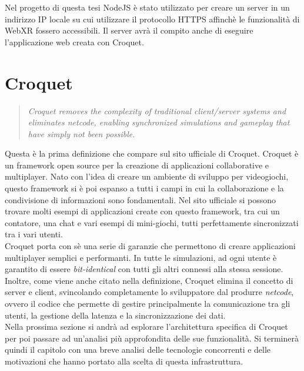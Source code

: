 Nel progetto di questa tesi NodeJS è stato utilizzato per creare un server in un indirizzo IP locale su cui utilizzare il protocollo HTTPS affinchè le funzionalità di WebXR fossero
accessibili. Il server avrà il compito anche di eseguire l'applicazione web creata con Croquet.


\section{Croquet}\label{sec:Croquet}
\begin{quote}
    \textit{Croquet removes the complexity of traditional client/server systems and eliminates netcode, enabling synchronized simulations and gameplay that have simply not been 
    possible.}\cite{Croquet}
\end{quote}
Questa è la prima definizione che compare sul sito ufficiale di Croquet. Croquet è un framework open source per la creazione di applicazioni collaborative e 
multiplayer. Nato con l'idea di creare un ambiente di sviluppo per videogiochi, questo framework si è poi espanso a tutti i campi in cui la collaborazione e la condivisione
di informazioni sono fondamentali. Nel sito ufficiale si possono trovare molti esempi di applicazioni create con questo framework, tra cui un contatore, una chat e vari esempi di mini-giochi, tutti
perfettamente sincronizzati tra i vari utenti.\\
Croquet porta con sè una serie di garanzie che permettono di creare applicazioni multiplayer semplici e performanti. In tutte le simulazioni, ad ogni utente
è garantito di essere \textit{bit-identical} con tutti gli altri connessi alla stessa sessione. Inoltre, come viene anche citato nella definizione, Croquet elimina il concetto
di server e client, svincolando completamente lo sviluppatore dal produrre \textit{netcode}, ovvero il codice che permette di gestire principalmente la comunicazione tra gli utenti,
la gestione della latenza e la sincronizzazione dei dati.\\ 
Nella prossima sezione si andrà ad esplorare l'architettura specifica di Croquet per poi passare ad un'analisi più approfondita delle sue funzionalità. Si terminerà quindi il capitolo
con una breve analisi delle tecnologie concorrenti e delle motivazioni che hanno portato alla scelta di questa infrastruttura.\\

